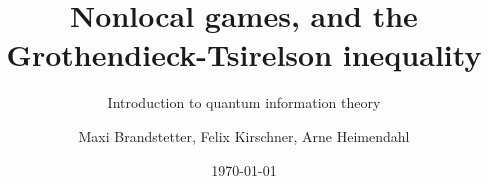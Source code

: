 

		\author{Maxi Brandstetter, Felix Kirschner, Arne Heimendahl}
		\title{Nonlocal games, and the Grothendieck-Tsirelson inequality}
		\subtitle{Introduction to quantum information theory}
			\date{\today}
		\begin{frame}
		\maketitle
	\end{frame}
	
		
	
	
	
	
	

